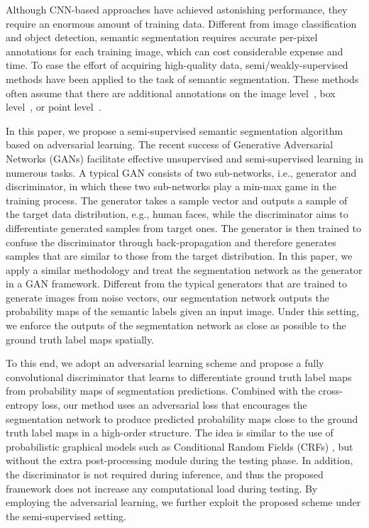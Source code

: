\documentclass{bmvc2k}
\begin{document}
	Although CNN-based approaches have achieved astonishing performance, they require an enormous amount of training data.
Different from image classification and object detection, semantic segmentation requires accurate per-pixel annotations for each training image, which can cost considerable expense and time.
To ease the effort of acquiring high-quality data, semi/weakly-supervised methods have been applied to the task of semantic segmentation.
These methods often assume that there are additional annotations on the image level~\cite{pinheiro2015weakly, papandreou2015weakly, hong2015decoupled, qi2016augmented, pathak2015constrained}, box level~\cite{dai2015boxsup}, or point level~\cite{bearman2016s}.
	
	
	In this paper, we propose a semi-supervised semantic segmentation algorithm based on adversarial learning.
The recent success of Generative Adversarial Networks (GANs) \cite{gan} 
	facilitate effective unsupervised and semi-supervised learning in numerous tasks. 
A typical GAN consists of two sub-networks, i.e., generator and discriminator, in which these two sub-networks play a min-max game in the training process. The generator takes a sample vector and outputs a sample of the target data distribution, e.g., human faces,
	while the discriminator aims to differentiate generated samples from target ones.
The generator is then trained to confuse the discriminator through back-propagation and therefore generates samples that are similar to those from the target distribution.
In this paper, we apply a similar methodology and treat the segmentation network as the generator in a GAN framework.
Different from the typical generators that are trained to generate images from noise vectors, our segmentation network outputs the probability maps of the semantic labels given an input image.
Under this setting, we enforce the outputs of the segmentation network as close as possible to the ground truth label maps spatially.


	
	To this end, we adopt an adversarial learning scheme and propose a fully convolutional discriminator that learns to differentiate ground truth label maps from probability maps of segmentation predictions.
Combined with the cross-entropy loss, our method uses an adversarial loss that encourages the segmentation network to produce predicted probability maps close to the ground truth label maps in a high-order structure.
The idea is similar to the use of probabilistic graphical models such as Conditional Random Fields (CRFs) \cite{crfasrnn,deeplab,piecewise}, but without the extra post-processing module during the testing phase.
In addition, the discriminator is not required during inference, and thus the proposed framework does not increase any computational load during testing.
By employing the adversarial learning, we further exploit the proposed scheme under the semi-supervised setting.
\end{document}
